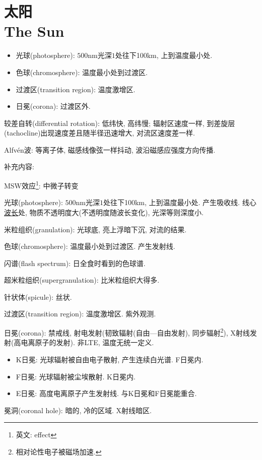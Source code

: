 \chapter{太阳\\The Sun}

\begin{itemize}
    \item 光球(photosphere): $500\text{nm}$光深$1$处往下100km, 上到温度最小处.
    \item 色球(chromosphere): 温度最小处到过渡区.
    \item 过渡区(transition region): 温度激增区.
    \item 日冕(corona): 过渡区外.
\end{itemize}

较差自转(differential rotation): 低纬快, 高纬慢; 辐射区速度一样, 到差旋层(tachocline)出现速度差且随半径迅速增大, 对流区速度差一样.

Alfv\'en波: 等离子体, 磁感线像弦一样抖动, 波沿磁感应强度方向传播.

补充内容:

MSW效应\footnote{英文: effect}: 中微子转变

光球(photosphere): $500\text{nm}$光深$1$处往下100km, 上到温度最小处. 产生吸收线. 线心\underline{波长}$\!\!$处, 物质不透明度大(不透明度随波长变化), 光深等则深度小.

米粒组织(granulation): 光球底, 亮上浮暗下沉, 对流的结果.

色球(chromosphere): 温度最小处到过渡区. 产生发射线.

闪谱(flash spectrum): 日全食时看到的色球谱.

超米粒组织(supergranulation): 比米粒组织大得多.

针状体(spicule): 丝状.

过渡区(transition region): 温度激增区. 紫外观测.

日冕(corona): 禁戒线, 射电发射(韧致辐射(自由---自由发射), 同步辐射\footnote{
    相对论性电子被磁场加速.
}), X射线发射(高电离原子的发射). 非LTE, 温度无统一定义.
\begin{itemize}
    \item K日冕: 光球辐射被自由电子散射, 产生连续白光谱. F日冕内.
    \item F日冕: 光球辐射被尘埃散射. K日冕内.
    \item E日冕: 高度电离原子产生发射线. 与K日冕和F日冕能重合.
\end{itemize}

冕洞(coronal hole): 暗的, 冷的区域. X射线暗区.

